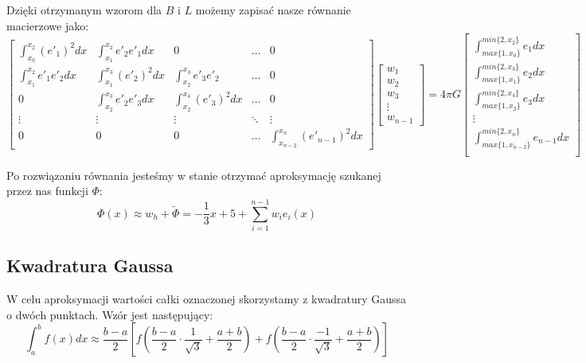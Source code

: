 \documentclass[11pt,a4paper]{article}
\begin{document}
Dzięki otrzymanym wzorom dla $B$ i $L$ możemy zapisać nasze równanie
macierzowe jako:
\begin{equation}
    \begin{bmatrix}
        \int_{x_0}^{x_2} (e'_1)^2 dx & \int_{x_1}^{x_2} e'_2 e'_1 dx & 0 & \dots & 0 \\
        \int_{x_1}^{x_2} e'_1 e'_2 dx & \int_{x_1}^{x_3} (e'_2)^2 dx & \int_{x_2}^{x_3} e'_3 e'_2 & \dots & 0\\
        0 & \int_{x_2}^{x_3} e'_2 e'_3 dx & \int_{x_2}^{x_4} (e'_3)^2 dx & \dots & 0\\
        \vdots & \vdots & \vdots & \ddots & \vdots \\
        0 & 0 & 0 & \dots & \int_{x_{n - 2}}^{x_{n}} (e'_{n - 1})^2 dx
    \end{bmatrix}
    \begin{bmatrix}
        w_1 \\ w_2 \\ w_3 \\ \vdots \\ w_{n - 1}
    \end{bmatrix}
    = 4 \pi G
    \begin{bmatrix}
        \int_{max\{1, x_0\}}^{min\{2, x_2\}} e_1 dx \\
        \int_{max\{1, x_1\}}^{min\{2, x_3\}} e_2 dx \\
        \int_{max\{1, x_2\}}^{min\{2, x_4\}} e_3 dx \\
        \vdots \\
        \int_{max\{1, x_{n - 2}\}}^{min\{2, x_n\}} e_{n - 1} dx \\
    \end{bmatrix}
\end{equation}

Po rozwiązaniu równania jesteśmy w stanie otrzymać
aproksymację szukanej przez nas funkcji $\Phi$:
\begin{equation}
    \Phi(x) \approx w_h + \widetilde{\Phi}
    = -\frac{1}{3} x + 5 + \sum_{i = 1}^{n - 1} w_i e_i(x)
\end{equation}

\subsection{Kwadratura Gaussa}
W celu aproksymacji wartości całki oznaczonej
skorzystamy z kwadratury Gaussa o dwóch punktach.
Wzór jest następujący:
\begin{equation}
    \int_{a}^{b} f(x) dx \approx
    \frac{b - a}{2}[f(\frac{b - a}{2}\cdot \frac{1}{\sqrt{3}} + \frac{a + b}{2})
    + f(\frac{b - a}{2}\cdot \frac{-1}{\sqrt{3}} + \frac{a + b}{2})]
\end{equation}
\end{document}
